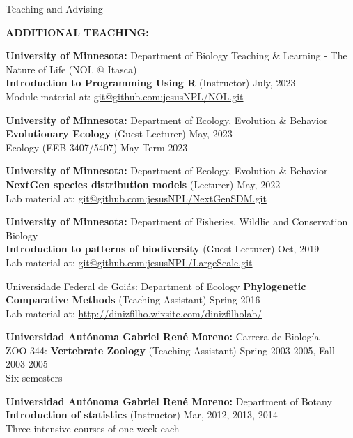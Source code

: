 \documentclass{resume} %
\begin{document}
\begin{rSection}{Teaching and Advising}

\textbf{ADDITIONAL TEACHING:}

{\bf University of Minnesota: }{Department of Biology Teaching \& Learning - The Nature of Life (NOL @ Itasca)} \\
\textbf{Introduction to Programming Using R} (Instructor) \hfill July, 2023 \\
{Module material at:
\url{git@github.com:jesusNPL/NOL.git}}\smallskip 

{\bf University of Minnesota: }{Department of Ecology, Evolution \& Behavior } \\
\textbf{Evolutionary Ecology} (Guest Lecturer) \hfill May, 2023 \\
{Ecology (EEB 3407/5407) May Term 2023}\smallskip 

{\bf University of Minnesota: }{Department of Ecology, Evolution \& Behavior } \\
\textbf{NextGen species distribution models} (Lecturer) \hfill May, 2022 \\
{Lab material at:
\url{git@github.com:jesusNPL/NextGenSDM.git}}\smallskip 

{\bf University of Minnesota: }{Department of Fisheries, Wildlie and Conservation Biology } \\
\textbf{Introduction to patterns of biodiversity} (Guest Lecturer) \hfill Oct, 2019 \\
{Lab material at:
\url{git@github.com:jesusNPL/LargeScale.git}}\smallskip 

\begin{reSubsection}{Universidade Federal de Goiás: }{Department of Ecology }{}{
\textbf{Phylogenetic Comparative Methods} (Teaching Assistant) \hfill Spring 2016 \\ 
{Lab material at:
\url{http://dinizfilho.wixsite.com/dinizfilholab/}} \smallskip 
} 
\end{reSubsection}

{\bf Universidad Autónoma Gabriel René Moreno: }{Carrera de Biología } \\
ZOO 344: \textbf{Vertebrate Zoology} (Teaching Assistant) \hfill Spring 2003-2005, Fall 2003-2005 \\
{Six semesters}\smallskip 

{\bf Universidad Autónoma Gabriel René Moreno: }{Department of Botany } \\
\textbf{Introduction of statistics} (Instructor) \hfill Mar, 2012, 2013, 2014 \\
{Three intensive courses of one week each}\smallskip 


\end{rSection}
\end{document}
